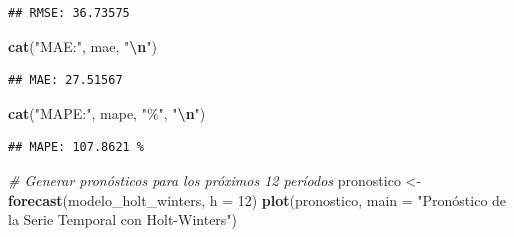 \documentclass[
]{book}
\newenvironment{Shaded}{\begin{snugshade}}{\end{snugshade}}
\newcommand{\AttributeTok}[1]{\textcolor[rgb]{0.13,0.29,0.53}{#1}}
\newcommand{\CommentTok}[1]{\textcolor[rgb]{0.56,0.35,0.01}{\textit{#1}}}
\newcommand{\DecValTok}[1]{\textcolor[rgb]{0.00,0.00,0.81}{#1}}
\newcommand{\FunctionTok}[1]{\textcolor[rgb]{0.13,0.29,0.53}{\textbf{#1}}}
\newcommand{\NormalTok}[1]{#1}
\newcommand{\OtherTok}[1]{\textcolor[rgb]{0.56,0.35,0.01}{#1}}
\newcommand{\SpecialCharTok}[1]{\textcolor[rgb]{0.81,0.36,0.00}{\textbf{#1}}}
\newcommand{\StringTok}[1]{\textcolor[rgb]{0.31,0.60,0.02}{#1}}
\begin{document}
\begin{Shaded}
\end{Shaded}

\begin{verbatim}
## RMSE: 36.73575
\end{verbatim}

\begin{Shaded}
\begin{Highlighting}[]
\FunctionTok{cat}\NormalTok{(}\StringTok{"MAE:"}\NormalTok{, mae, }\StringTok{"}\SpecialCharTok{\textbackslash{}n}\StringTok{"}\NormalTok{)}
\end{Highlighting}
\end{Shaded}

\begin{verbatim}
## MAE: 27.51567
\end{verbatim}

\begin{Shaded}
\begin{Highlighting}[]
\FunctionTok{cat}\NormalTok{(}\StringTok{"MAPE:"}\NormalTok{, mape, }\StringTok{"\%"}\NormalTok{, }\StringTok{"}\SpecialCharTok{\textbackslash{}n}\StringTok{"}\NormalTok{)}
\end{Highlighting}
\end{Shaded}

\begin{verbatim}
## MAPE: 107.8621 %
\end{verbatim}

\begin{Shaded}
\begin{Highlighting}[]
\CommentTok{\# Generar pronósticos para los próximos 12 períodos}
\NormalTok{pronostico }\OtherTok{\textless{}{-}} \FunctionTok{forecast}\NormalTok{(modelo\_holt\_winters, }\AttributeTok{h =} \DecValTok{12}\NormalTok{)}
\FunctionTok{plot}\NormalTok{(pronostico, }\AttributeTok{main =} \StringTok{"Pronóstico de la Serie Temporal con Holt{-}Winters"}\NormalTok{)}
\end{Highlighting}
\end{Shaded}
\end{document}
